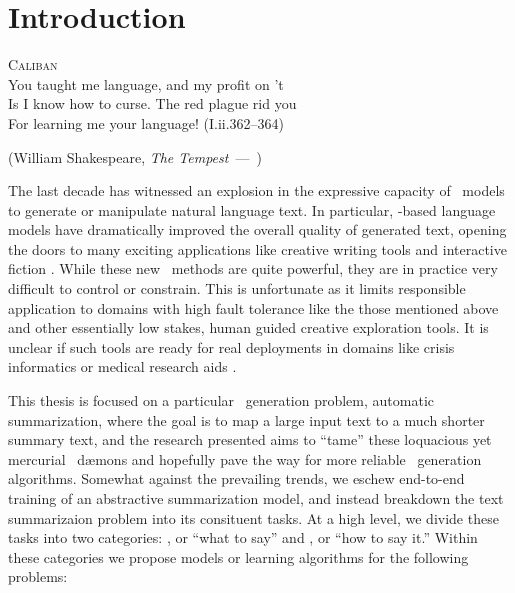 
\let\oldquote\quote
\let\endoldquote\endquote
\renewenvironment{quote}[2][]
  {\if\relax\detokenize{#1}\relax
     \def\quoteauthor{#2}%
   \else
     \def\quoteauthor{#2~---~#1}%
   \fi
   \oldquote}
  {\par\nobreak\smallskip\hfill(\quoteauthor)%
   \endoldquote\addvspace{\bigskipamount}}


\chapter{Introduction}

\begin{quote}{William Shakespeare, \textit{The Tempest}}
    \textsc{Caliban} \\
You taught me language, and my profit on ’t \\
Is I know how to curse. The red plague rid you  \\
For learning me your language! (I.ii.362--364)
\end{quote}



The last decade has witnessed an explosion in the expressive capacity of 
\machinelearning~models to generate or manipulate 
natural language text. In particular, 
\deeplearning-based language models have dramatically improved the overall 
quality of generated text, opening the doors to many exciting applications like
creative writing tools \cite{something} and interactive fiction 
\cite{thatgame}. 
While these new \naturallanguagegeneration~methods are quite powerful, 
they are in practice very difficult to control or constrain. This 
is unfortunate as it limits responsible application to domains with high 
fault tolerance like the those mentioned above and other essentially low stakes,
human guided creative exploration tools. It is unclear if such tools are 
ready for real deployments in domains like crisis informatics \cite{ci}
or medical research aids \cite{something}.

This thesis is focused on a particular \texttotext~generation problem, 
automatic summarization, where the goal is to map a large input text to
a much shorter summary text, and the research presented aims
to ``tame'' these loquacious 
yet mercurial \machinelearning~d{\ae}mons and hopefully pave the way for 
more reliable \texttotext~generation algorithms. 
Somewhat against the prevailing trends, we eschew end-to-end training 
of an abstractive summarization model, and instead breakdown the text 
summarizaion problem into its consituent tasks. 
At a high level, we divide these tasks into two
categories: \contentselection, or ``what to say'' and 
\surfacerealization, or ``how to say it.'' 
Within these categories we propose models or learning algorithms
for the following problems:

